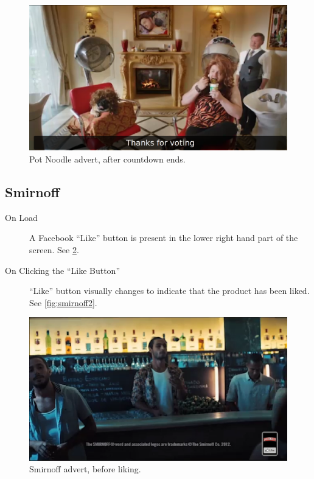 	\begin{figure}[th]
		\centering
		\includegraphics[width=\textwidth,height=0.5\textheight,keepaspectratio]{images/adverts/pot_noodle-4.png}
		\caption{Pot Noodle advert, after countdown ends.}
		\label{fig:potNoodle4}
	\end{figure}
	
\subsection{Smirnoff}
	\begin{description}
		\item[On Load]{A Facebook ``Like'' button is present in the lower right hand part of the screen. See \ref{fig:smirnoff1}.}
		\item[On Clicking the ``Like Button'']{``Like'' button visually changes to indicate that the product has been liked. See \ref{fig:smirnoff2}.}
	\end{description}
	
	\begin{figure}[th]
		\centering
		\includegraphics[width=\textwidth,height=0.5\textheight,keepaspectratio]{images/adverts/smirnoff-1.png}
		\caption{Smirnoff advert, before liking.}
		\label{fig:smirnoff1}
	\end{figure}
	
